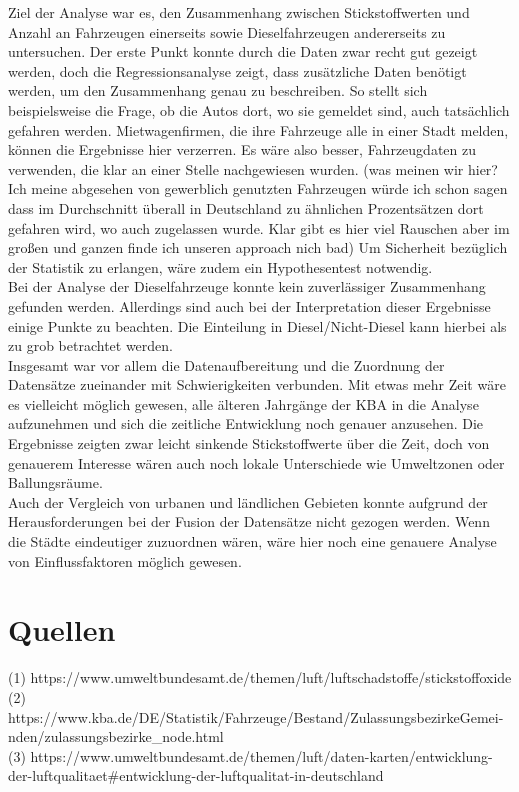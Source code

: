 \documentclass[11pt,a4paper,oneside,german]{article}
\begin{document}
	Ziel der Analyse war es, den Zusammenhang zwischen Stickstoffwerten und Anzahl an Fahrzeugen einerseits sowie Dieselfahrzeugen andererseits zu untersuchen. Der erste Punkt konnte durch die Daten zwar recht gut gezeigt werden, doch die Regressionsanalyse zeigt, dass zusätzliche Daten benötigt werden, um den Zusammenhang genau zu beschreiben. So stellt sich beispielsweise die Frage, ob die Autos dort, wo sie gemeldet sind, auch tatsächlich gefahren werden. Mietwagenfirmen, die ihre Fahrzeuge alle in einer Stadt melden, können die Ergebnisse hier verzerren. Es wäre also besser, Fahrzeugdaten zu verwenden, die klar an einer Stelle nachgewiesen wurden. (was meinen wir hier? Ich meine abgesehen von gewerblich genutzten Fahrzeugen würde ich schon sagen dass im Durchschnitt überall in Deutschland zu ähnlichen Prozentsätzen dort gefahren wird, wo auch zugelassen wurde. Klar gibt es hier viel Rauschen aber im großen und ganzen finde ich unseren approach nich bad) Um Sicherheit bezüglich der Statistik zu erlangen, wäre zudem ein Hypothesentest notwendig. \\
	Bei der Analyse der Dieselfahrzeuge konnte kein zuverlässiger Zusammenhang gefunden werden. Allerdings sind auch bei der Interpretation dieser Ergebnisse einige Punkte zu beachten. Die Einteilung in Diesel/Nicht-Diesel kann hierbei als zu grob betrachtet werden. \\
	Insgesamt war vor allem die Datenaufbereitung und die Zuordnung der Datensätze zueinander mit Schwierigkeiten verbunden. Mit etwas mehr Zeit wäre es vielleicht möglich gewesen, alle älteren Jahrgänge der KBA in die Analyse aufzunehmen und sich die zeitliche Entwicklung noch genauer anzusehen. Die Ergebnisse zeigten zwar leicht sinkende Stickstoffwerte über die Zeit, doch von genauerem Interesse wären auch noch lokale Unterschiede wie Umweltzonen oder Ballungsräume. \\
	Auch der Vergleich von urbanen und ländlichen Gebieten konnte aufgrund der Herausforderungen bei der Fusion der Datensätze nicht gezogen werden. Wenn die Städte eindeutiger zuzuordnen wären, wäre hier noch eine genauere Analyse von Einflussfaktoren möglich gewesen. \\
	
	\section{Quellen}
	
	(1) https://www.umweltbundesamt.de/themen/luft/luftschadstoffe/stickstoffoxide\\
	(2) https://www.kba.de/DE/Statistik/Fahrzeuge/Bestand/ZulassungsbezirkeGemei-nden/zulassungsbezirke\_node.html\\
	(3) https://www.umweltbundesamt.de/themen/luft/daten-karten/entwicklung-der-luftqualitaet\#entwicklung-der-luftqualitat-in-deutschland \\
	
	
	
\end{document}
